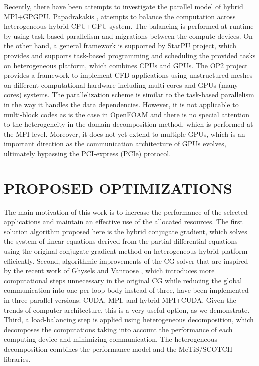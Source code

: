 \documentclass[3p,times]{elsarticle}
\begin{document}
Recently, there have been attempts to investigate the parallel model of hybrid MPI+GPGPU. Papadrakakis \cite{Papadrakakis20111490}, attempts to balance the computation across heterogeneous hybrid CPU+GPU system. The balancing is performed at runtime by using task-based parallelism and migrations between the compute devices. On the other hand, a general framework is supported by StarPU \cite{starpu} project, which provides and supports task-based programming and scheduling the provided tasks on heterogeneous platform, which combines CPUs and GPUs. The OP2 project \cite{OP2} provides a framework to implement CFD applications using unstructured meshes on different computational hardware including multi-cores and GPUs (many-cores) systems. The parallelization scheme is similar to the task-based parallelism in the way it handles the data dependencies. However, it is not applicable to multi-block codes as is the case in OpenFOAM and there is no special attention to the heterogeneity in the domain decomposition method, which is performed at the MPI level. Moreover, it does not yet extend to multiple GPUs, which is an important direction as the communication architecture of GPUs evolves, ultimately bypassing the PCI-express (PCIe) protocol. 

\section{PROPOSED OPTIMIZATIONS}
The main motivation of this work is to increase the performance of the selected applications and maintain an effective use of the allocated resources. The first solution algorithm proposed here is the hybrid conjugate gradient, which solves the system of linear equations derived from the partial differential equations using the original conjugate gradient method on heterogeneous hybrid platform efficiently. Second, algorithmic improvements of the CG solver that are inspired by the recent work of Ghysels and Vanroose \cite{pipecg}, which introduces more computational steps unnecessary in the original CG while reducing the global communication into one per loop body instead of three, have been implemented in three parallel versions: CUDA, MPI, and hybrid MPI+CUDA. Given the trends of computer architecture, this is a very useful option, as we demonstrate. Third, a load-balancing step is applied using heterogeneous decomposition, which decomposes the computations taking into account the performance of each computing device and minimizing communication. The heterogeneous decomposition combines the performance model and the MeTiS/SCOTCH libraries. \\
\end{document}
